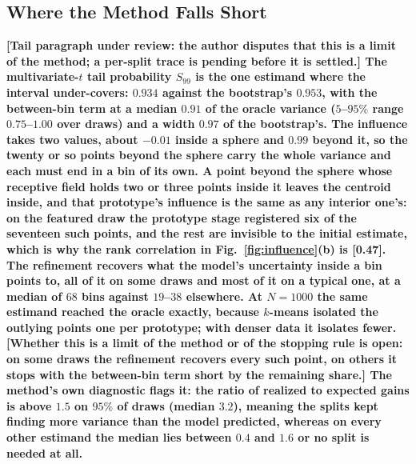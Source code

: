 \documentclass[runningheads]{llncs}
\newif\ifrev \revtrue
\newcommand{\rev}[1]{\ifrev{\color{blue}\bfseries #1}\else#1\fi}
\newcommand{\pending}[1]{{\color{red}[#1]}}
\begin{document}
\subsection{Where the Method Falls Short}\label{sec:res-limits}

\rev{\pending{Tail paragraph under review: the author disputes that this is a limit of the method; a per-split trace is pending before it is settled.} The multivariate-$t$ tail probability $S_{99}$ is the one estimand where the interval under-covers: $0.934$ against the bootstrap's $0.953$, with the between-bin term at a median $0.91$ of the oracle variance ($5$--$95\%$ range $0.75$--$1.00$ over draws) and a width $0.97$ of the bootstrap's. The influence takes two values, about $-0.01$ inside a sphere and $0.99$ beyond it, so the twenty or so points beyond the sphere carry the whole variance and each must end in a bin of its own. A point beyond the sphere whose receptive field holds two or three points inside it leaves the centroid inside, and that prototype's influence is the same as any interior one's: on the featured draw the prototype stage registered six of the seventeen such points, and the rest are invisible to the initial estimate, which is why the rank correlation in Fig.~\ref{fig:influence}(b) is \pending{0.47}. The refinement recovers what the model's uncertainty inside a bin points to, all of it on some draws and most of it on a typical one, at a median of $68$ bins against $19$--$38$ elsewhere. At $N = 1000$ the same estimand reached the oracle exactly, because $k$-means isolated the outlying points one per prototype; with denser data it isolates fewer. \pending{Whether this is a limit of the method or of the stopping rule is open: on some draws the refinement recovers every such point, on others it stops with the between-bin term short by the remaining share.} The method's own diagnostic flags it: the ratio of realized to expected gains is above $1.5$ on $95\%$ of draws (median $3.2$), meaning the splits kept finding more variance than the model predicted, whereas on every other estimand the median lies between $0.4$ and $1.6$ or no split is needed at all.}
\end{document}
